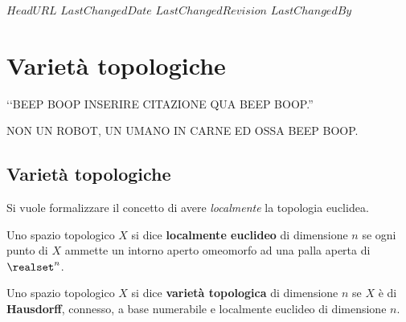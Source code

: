 \svnidlong
{$HeadURL$}
{$LastChangedDate$}
{$LastChangedRevision$}
{$LastChangedBy$}

\chapter{Varietà topologiche}

\begin{introduction}
	‘‘BEEP BOOP INSERIRE CITAZIONE QUA BEEP BOOP.''
	\begin{flushright}
		\textsc{NON UN ROBOT,} UN UMANO IN CARNE ED OSSA BEEP BOOP.
	\end{flushright}
\end{introduction}

\section{Varietà topologiche}
Si vuole formalizzare il concetto di avere \textit{localmente} la topologia euclidea. 
\begin{define}
	Uno spazio topologico $X$ si dice \textbf{localmente euclideo} di dimensione $n$ se ogni punto di $X$ ammette un intorno aperto omeomorfo ad una palla aperta di $\realset^n$.
\end{define}

\begin{define}
	Uno spazio topologico $X$ si dice \textbf{varietà topologica} di dimensione $n$ se $X$ è di \textbf{Hausdorff}, connesso, a base numerabile e localmente euclideo di dimensione $n$.
\end{define}

